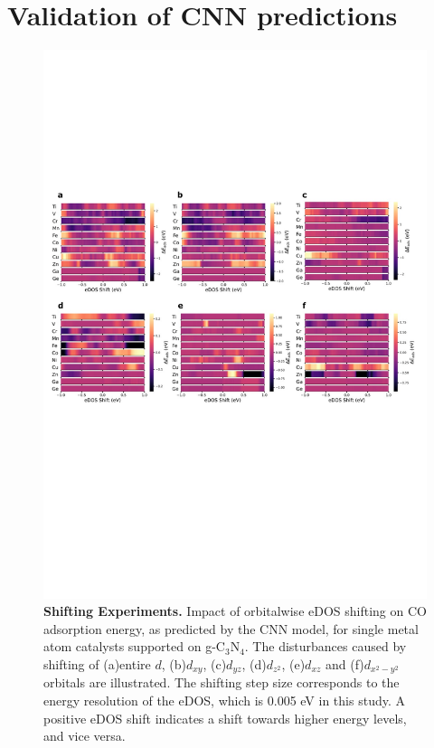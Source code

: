 

\section{Validation of CNN predictions}


\begin{figure}
    \centering
    \includegraphics[width=0.95\linewidth]{main_fig5_shifting.JPG}
    \caption{\textbf{Shifting Experiments.}
    Impact of orbitalwise eDOS shifting on CO adsorption energy, as predicted by the CNN model, for single metal atom catalysts supported on g-$\mathrm{C_3N_4}$.
    The disturbances caused by shifting of (a)entire $d$, (b)$d_{xy}$, (c)$d_{yz}$, (d)$d_{z^2}$, (e)$d_{xz}$ and (f)$d_{x^2-y^2}$ orbitals are illustrated.
    The shifting step size corresponds to the energy resolution of the eDOS, which is 0.005 eV in this study.
    A positive eDOS shift indicates a shift towards higher energy levels, and vice versa.}
    \label{main_fig5:shifting}
\end{figure}


